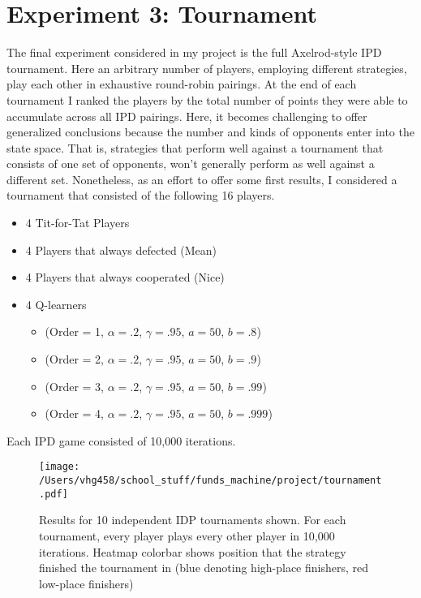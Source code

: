 \documentclass[12pt]{amsart}
\newcommand{\0}{\mat{0}}
\newcommand{\1}{\mathds{1}}
\begin{document}
\section{Experiment 3: Tournament}

The final experiment considered in my project is the full Axelrod-style IPD tournament.  Here an arbitrary number of players, employing different strategies, play each other in exhaustive round-robin pairings.  At the end of each tournament I ranked the players by the total number of points they were able to accumulate across all IPD pairings.  Here, it becomes challenging  to offer generalized conclusions because the number and kinds of opponents enter into the state space.  That is, strategies that perform well against a tournament that consists of one set of opponents, won't generally perform as well against a different set.  Nonetheless, as an effort to offer some first results, I considered a tournament that consisted of the following 16 players.
\begin{itemize}
  \item 4 Tit-for-Tat Players
  \item 4 Players that always defected (Mean)
  \item 4 Players that always cooperated (Nice)
  \item 4 Q-learners 
  \begin{itemize}
  	\item (Order = 1, $\alpha =.2$, $\gamma =.95$, $a=50$, $b=.8$)
	\item (Order = 2, $\alpha =.2$, $\gamma =.95$, $a=50$, $b=.9$)
	\item (Order = 3, $\alpha =.2$, $\gamma =.95$, $a=50$, $b=.99$)
	\item (Order = 4, $\alpha =.2$, $\gamma =.95$, $a=50$, $b=.999$) 
	\end{itemize}
\end{itemize}
Each IPD game consisted of 10,000 iterations.
 \begin{figure}
    \texttt{[image: /Users/vhg458/school\_stuff/funds\_machine/project/tournament.pdf]}
      \centering
        \caption{Results for 10 independent IDP tournaments shown.  For each tournament, every player plays every other player in 10,000 iterations.  Heatmap colorbar shows position that the strategy finished the tournament in (blue denoting high-place finishers, red low-place finishers)}
  	\label{fig:tournament}
    \end{figure}
\end{document}
